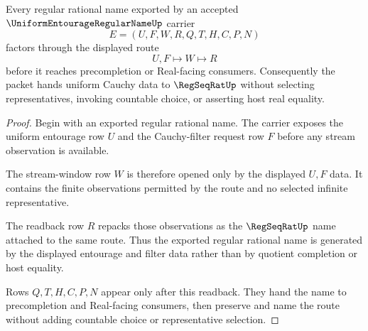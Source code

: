 \begin{theorem}
\label{thm:uniform-entourage-regular-name-regseqrat-handoff}
Every regular rational name exported by an accepted $\UniformEntourageRegularNameUp$ carrier
$$
E=(U,F,W,R,Q,T,H,C,P,N)
$$
factors through the displayed route
$$
U,F \longmapsto W \longmapsto R
$$
before it reaches precompletion or Real-facing consumers. Consequently the packet hands uniform Cauchy data to $\RegSeqRatUp$ without selecting representatives, invoking countable choice, or asserting host real equality.
\end{theorem}
\begin{proof}
Begin with an exported regular rational name. The carrier exposes the uniform entourage row $U$ and the Cauchy-filter request row $F$ before any stream observation is available.

The stream-window row $W$ is therefore opened only by the displayed $U,F$ data. It contains the finite observations permitted by the route and no selected infinite representative.

The readback row $R$ repacks those observations as the $\RegSeqRatUp$ name attached to the same route. Thus the exported regular rational name is generated by the displayed entourage and filter data rather than by quotient completion or host equality.

Rows $Q,T,H,C,P,N$ appear only after this readback. They hand the name to precompletion and Real-facing consumers, then preserve and name the route without adding countable choice or representative selection.
\end{proof}

